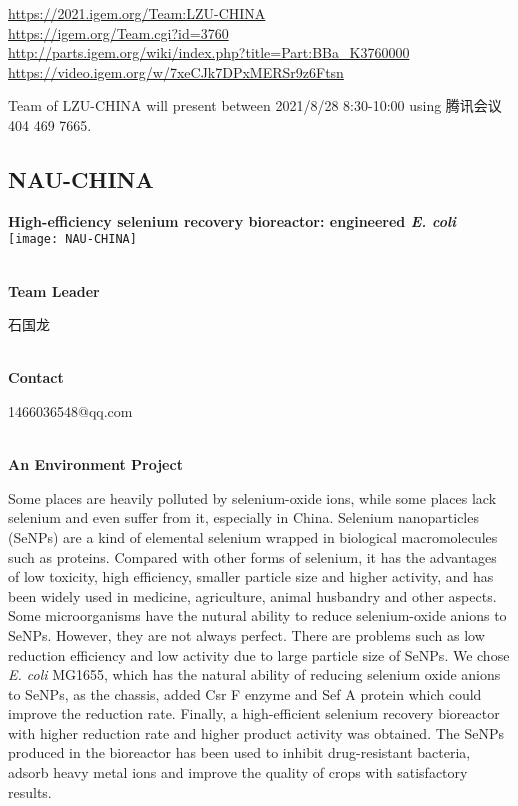 \url{https://2021.igem.org/Team:LZU-CHINA }\\
\url{https://igem.org/Team.cgi?id=3760 }\\
\url{http://parts.igem.org/wiki/index.php?title=Part:BBa_K3760000 }\\
\url{https://video.igem.org/w/7xeCJk7DPxMERSr9z6Ftsn }\\

\vfill{}









Team of LZU-CHINA will present between    2021/8/28 8:30-10:00     using 腾讯会议 404 469 7665.
\newpage


\subsection{\textcolor{Blu}{ NAU-CHINA } }
\vspace{5mm}
\begin{center}
\large{
  \textbf{ High-efficiency selenium recovery bioreactor: engineered \textit{E. coli} }\\

  \texttt{[image: NAU-CHINA]}
}
\end{center}
\textbf{\\Team Leader}

  石国龙


\textbf{\\Contact}

  1466036548@qq.com

\textbf{\\An Environment Project\\}\begin{spacing}{1.5}

Some places are heavily polluted by selenium-oxide ions, while some places lack selenium and even suffer from it, especially in China. Selenium nanoparticles (SeNPs) are a kind of elemental selenium wrapped in biological macromolecules such as proteins. Compared with other forms of selenium, it has the advantages of low toxicity, high efficiency, smaller particle size and higher activity, and has been widely used in medicine, agriculture, animal husbandry and other aspects. Some microorganisms have the nutural ability to reduce selenium-oxide anions to SeNPs. However, they are not always perfect. There are problems such as low reduction efficiency and low activity due to large particle size of SeNPs. We chose \textit{E. coli} MG1655, which has the natural ability of reducing selenium oxide anions to SeNPs, as the chassis, added Csr F enzyme and Sef  A protein which could improve the reduction rate. Finally, a high-efficient selenium recovery bioreactor with higher reduction rate and higher product activity was obtained. The SeNPs produced in the bioreactor has been used to inhibit drug-resistant bacteria, adsorb heavy metal ions and improve the quality of crops with satisfactory results.\end{spacing}
\\

